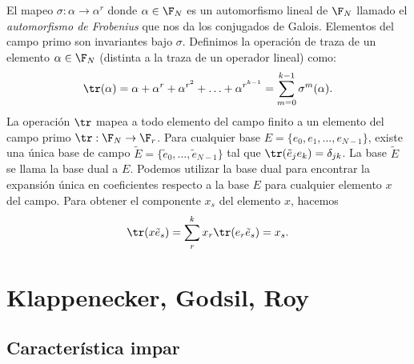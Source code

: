   El mapeo $\sigma : \alpha \to \alpha^r$ donde $\alpha \in
  \F_N$ es un automorfismo lineal de $\F_N$ llamado el
  \textit{automorfismo de Frobenius} que nos da los
  conjugados de Galois. Elementos del campo primo son
  invariantes bajo $\sigma$. Definimos la operación de traza
  de un elemento $\alpha \in \F_N$ (distinta a la traza de
  un operador lineal) como:
  \[
    \tr(\alpha) 
    = \alpha + \alpha^{r} + \alpha^{r^2} + \ldots +
    \alpha^{r^{k-1}}
    = \sum_{m=0}^{k-1} \sigma^{m}(\alpha).
  \] 
  La operación $\tr$ mapea a todo elemento del campo finito
  a un elemento del campo primo $\tr : \F_N \to \F_r$. Para
  cualquier base $E = \{e_0,e_1,\ldots,e_{N-1}\}$, existe
  una única base de campo $\tilde E = \{\tilde
  e_0,\ldots,\tilde e_{N-1}\}$ tal que $\tr(\tilde e_j e_k)
  = \delta_{jk}$. La base $\tilde E$ se llama la base dual a
  $E$. Podemos utilizar la base dual para encontrar la
  expansión única en coeficientes respecto a la base $E$ 
  para cualquier elemento $x$ del campo. Para obtener el
  componente $x_s$ del elemento $x$, hacemos
  \[
    \tr(x \tilde e_s)
    = \sum_{r}^{k} x_r \tr(e_r \tilde e_s)
    = x_s.
  \]

  \section{Klappenecker, Godsil, Roy}

  \subsection{Característica impar}

